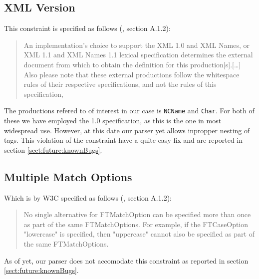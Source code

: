 \subsection{XML Version}
\label{sect:implementation:xmlVersion}
This constraint is specified as follows (\cite{w3c00}, section A.1.2):
\begin{quote}
An implementation's choice to support the XML 1.0 and XML Names, or XML 1.1 and XML Names 1.1 lexical specification determines the external document from which to obtain the definition for this production[s].[\ldots] Also please note that these external productions follow the whitespace rules of their respective specifications, and not the rules of this specification,
\end{quote}

The productions refered to of interest in our case is \verb!NCName! and \verb!Char!. For both of these we have employed the 1.0 specification, as this is the one in most widespread use. However, at this date our parser yet allows inpropper nesting of tags. This violation of the constraint have a quite easy fix and are reported in section \ref{sect:future:knownBugs}.

\subsection{Multiple Match Options}
\label{sect:implementation:multipleMatchOptions}
Which is by W3C specified as follows (\cite{w3c00}, section A.1.2):
\begin{quote}
No single alternative for FTMatchOption can be specified more than once as part of the same FTMatchOptions. For example, if the FTCaseOption "lowercase" is specified, then "uppercase" cannot also be specified as part of the same FTMatchOptions.
\end{quote}

As of yet, our parser does not accomodate this constraint as reported in section \ref{sect:future:knownBugs}.

